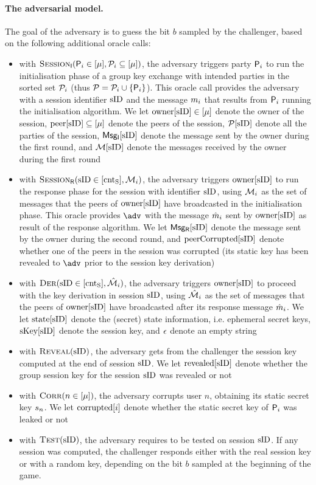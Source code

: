 \paragraph{The adversarial model.}
The goal of the adversary is to guess the bit $b$ sampled by the challenger, based on the following additional oracle calls:
\begin{itemize}
	\item with $\GakeIniO ( \GIni  \in [\mu], \PartySet_{i} \subseteq [\mu])$, the adversary triggers party $\User[i]$ to run the initialisation phase of a group key exchange with intended parties in the sorted set $\PartySet_{i}$ (thus $\PartySet = \PartySet_{i}  \cup \{\User[i]\}$). This oracle call provides the adversary with a session identifier $\sID$ and the message $\GakeIniMes_{i}$ that results from $\User[i]$ running the initialisation algorithm. We let $\owner[\sID] \in [\mu]$ denote the owner of the session, $\peer[\sID] \subseteq[\mu]$ denote the peers of the session, $\GakeUSet[\sID]$ denote all the parties of the session, $\GIniMes[\sID]$ denote the message sent by the owner during the first round, and $\GIniMesSet[\sID]$ denote the messages received by the owner during the first round
	\item with $\GakeResO(\sID \in [\cntS], \GakeIniMesSet[{i}] )$, the adversary triggers $\owner[\sID]$ to run the response phase for the session with identifier $\sID$, using $\GakeIniMesSet[i]$ as the set of messages that the peers of $\owner[\sID]$ have broadcasted in the initialisation phase. This oracle provides $\adv$ with the message $\GakeResMes_{i}$ sent by $\owner[\sID]$ as result of the response algorithm. We let $\GResMes[\sID]$ denote the message sent by the owner during the second round, and $\peercorrupted[\sID]$ denote whether one of the peers in the session was corrupted (its static key has been revealed to $\adv$ prior to the session key derivation)
	\item with $\GakeDerO(\GakeResUsID \in [\cntS],  \GakeResMesSet[{i}])$, the adversary triggers $\owner[\sID]$ to proceed with the key derivation in session $\sID$, using $\GakeResMesSet[i]$ as the set of messages that the peers of $\owner[\sID]$ have broadcasted after its response message $\GakeResMes_{i}$. We let $\Gstates[\sID]$ denote the (secret) state information, i.e. ephemeral secret keys, $\ListGakeSessKey[\sID]$ denote the session key, and $\emptystr$ denote an empty string
	\item with $\RevealO(\sID)$, the adversary gets from the challenger the session key computed at the end of session $\sID$. We let $\revealed[\sID]$ denote whether the group session key for the session $\sID$ was revealed or not
	\item with $\CorruptO(n \in [\mu])$, the adversary corrupts user $n$, obtaining its static secret key $\ssk_n$. We let $\corrupted[{i}]$ denote whether the static secret key of  $\User[{i}]$ was leaked or not
	\item with $\TestO(\sID)$, the adversary requires to be tested on session $\sID$. If any session was computed, the challenger responds either with the real session key or with a random key, depending on the bit $b$ sampled at the beginning of the game.
\end{itemize}

